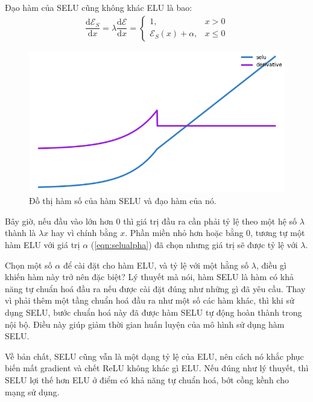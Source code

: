 Đạo hàm của SELU cũng không khác ELU là bao:
\begin{align}
    \dfrac{\text{d}\mathcal{E}_S}{\text{d}x} =  \lambda\dfrac{\text{d}\mathcal{E}}{\text{d}x} =  \begin{cases}1, &x > 0\\\mathcal{E}_S(x) + \alpha, &x \le 0\end{cases}\label{eqn:daohamselu}
\end{align}

\begin{figure}[!h]
\captionsetup{width=0.8\textwidth}
\centering
\includegraphics[width=15cm]{images/selufunc.PNG}
\caption{Đồ thị hàm số của hàm SELU và đạo hàm của nó.}
\label{fig:selufunc}
\end{figure}

Bây giờ, nếu đầu vào lớn hơn 0 thì giá trị đầu ra cần phải tỷ lệ theo một hệ số $\lambda$ thành là $\lambda x$ hay vì chính bằng $x$.
Phần miền nhỏ hơn hoặc bằng 0, tương tự một hàm ELU với giá trị $\alpha$ (\ref{eqn:selualpha}) đã chọn nhưng giá trị sẽ được tỷ lệ với $\lambda$.
\vspace{5pt}

Chọn một số $\alpha$ để cài đặt cho hàm ELU, và tỷ lệ với một hằng số $\lambda$, điều gì khiến hàm này trở nên đặc biệt?
Lý thuyết mà nói, hàm SELU là hàm có khả năng tự chuẩn hoá đầu ra nếu được cài đặt đúng như những gì đã yêu cầu.
Thay vì phải thêm một tầng chuẩn hoá đầu ra như một số các hàm khác, thì khi sử dụng SELU, bước chuẩn hoá này đã được hàm SELU tự động hoàn thành trong nội bộ.
Điều này giúp giảm thời gian huấn luyện của mô hình sử dụng hàm SELU.
\vspace{5pt}

Về bản chất, SELU cũng vẫn là một dạng tỷ lệ của ELU, nên cách nó khắc phục biến mất gradient và chết ReLU không khác gì ELU.
Nếu đúng như lý thuyết, thì SELU lợi thế hơn ELU ở điểm có khả năng tự chuẩn hoá, bớt cồng kềnh cho mạng sử dụng.

